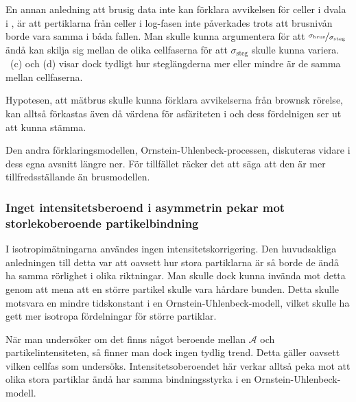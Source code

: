 En annan anledning att brusig data inte kan förklara avvikelsen för celler i dvala i , är att pertiklarna från celler i log-fasen inte påverkades trots att brusnivån borde vara samma i båda fallen. Man skulle kunna argumentera för att $\nicefrac{\sigma_\text{brus}}{\sigma_\text{steg}}$ ändå kan skilja sig mellan de olika cellfaserna för att $\sigma_\text{steg}$ skulle kunna variera. ~(c) och (d) visar dock tydligt hur steglängderna mer eller mindre är de samma mellan cellfaserna.

Hypotesen, att mätbrus skulle kunna förklara avvikelserna från brownsk rörelse, kan alltså förkastas även då värdena för asfäriteten i  och dess fördelnigen  ser ut att kunna stämma. 

Den andra förklaringsmodellen, Ornstein-Uhlenbeck-processen, diskuteras vidare i dess egna avsnitt längre ner. För tillfället räcker det att säga att den är mer tillfredsställande än brusmodellen. 



\subsubsection{Inget intensitetsberoend i asymmetrin pekar mot storlekoberoende partikelbindning}
I isotropimätningarna användes ingen intensitetskorrigering. Den huvudsakliga anledningen till detta var att oavsett hur stora partiklarna är så borde de ändå ha samma rörlighet i olika riktningar. Man skulle dock kunna invända mot detta genom att mena att en större partikel skulle vara hårdare bunden. Detta skulle motsvara en mindre tidskonstant i en Ornstein-Uhlenbeck-modell, vilket skulle ha gett mer isotropa fördelningar för större partiklar.

När man undersöker om det finns något beroende mellan $\mathcal{A}$ och partikelintensiteten, så finner man dock ingen tydlig trend. Detta gäller oavsett vilken cellfas som undersöks.
Intensitetsoberoendet här verkar alltså peka mot att olika stora partiklar ändå har samma bindningsstyrka i en Ornstein-Uhlenbeck-modell. 







